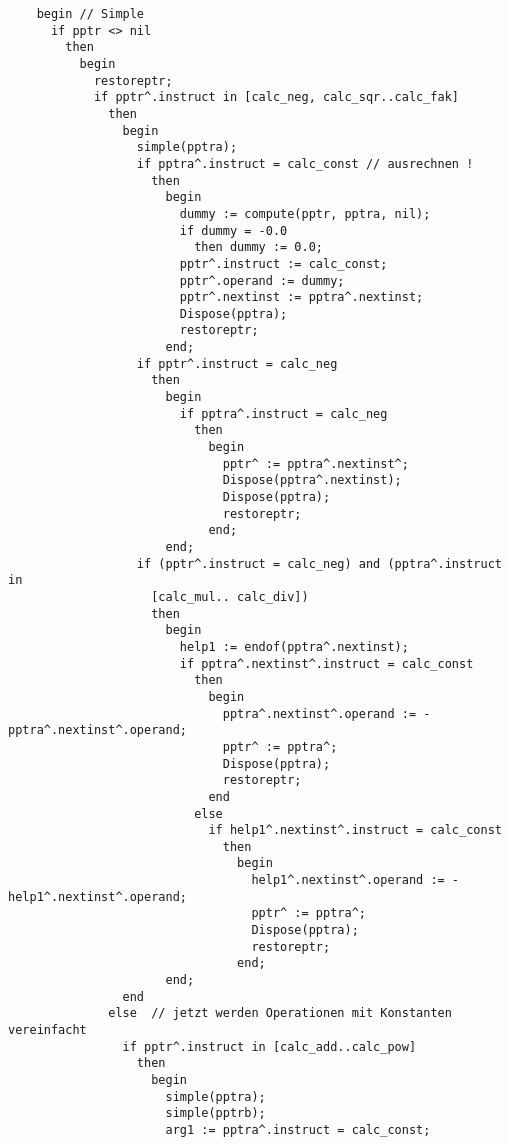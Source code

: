 \begin{refsection}
\begin{lstlisting}
    begin // Simple
      if pptr <> nil
        then
          begin
            restoreptr;
            if pptr^.instruct in [calc_neg, calc_sqr..calc_fak]
              then
                begin
                  simple(pptra);
                  if pptra^.instruct = calc_const // ausrechnen !
                    then
                      begin
                        dummy := compute(pptr, pptra, nil);
                        if dummy = -0.0
                          then dummy := 0.0;
                        pptr^.instruct := calc_const;
                        pptr^.operand := dummy;
                        pptr^.nextinst := pptra^.nextinst;
                        Dispose(pptra);
                        restoreptr;
                      end;
                  if pptr^.instruct = calc_neg
                    then
                      begin
                        if pptra^.instruct = calc_neg
                          then
                            begin
                              pptr^ := pptra^.nextinst^;
                              Dispose(pptra^.nextinst);
                              Dispose(pptra);
                              restoreptr;
                            end;
                      end;
                  if (pptr^.instruct = calc_neg) and (pptra^.instruct in
                    [calc_mul.. calc_div])
                    then
                      begin
                        help1 := endof(pptra^.nextinst);
                        if pptra^.nextinst^.instruct = calc_const
                          then
                            begin
                              pptra^.nextinst^.operand := -pptra^.nextinst^.operand;
                              pptr^ := pptra^;
                              Dispose(pptra);
                              restoreptr;
                            end
                          else
                            if help1^.nextinst^.instruct = calc_const
                              then
                                begin
                                  help1^.nextinst^.operand := -help1^.nextinst^.operand;
                                  pptr^ := pptra^;
                                  Dispose(pptra);
                                  restoreptr;
                                end;
                      end;
                end
              else  // jetzt werden Operationen mit Konstanten vereinfacht
                if pptr^.instruct in [calc_add..calc_pow]
                  then
                    begin
                      simple(pptra);
                      simple(pptrb);
                      arg1 := pptra^.instruct = calc_const;

\end{lstlisting}
\end{refsection}

